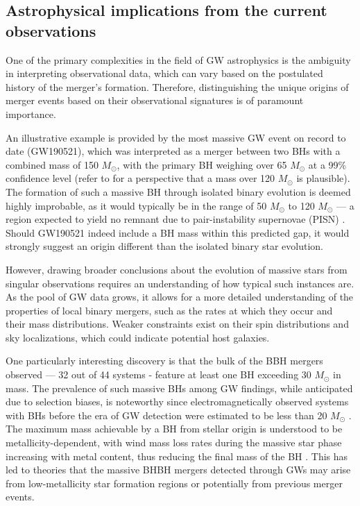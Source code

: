 \subsection{Astrophysical implications from the current observations}
One of the primary complexities in the field of GW astrophysics is the ambiguity in interpreting observational data, which can vary based on the postulated history of the merger's formation. Therefore, distinguishing the unique origins of merger events based on their observational signatures is of paramount importance.

An illustrative example is provided by the most massive GW event on record to date (GW190521), which was interpreted as a merger between two BHs with a combined mass of 150 $M_{\odot}$, with the primary BH weighing over 65 $M_{\odot}$ at a 99\% confidence level (refer to \cite{LIGOScientific:2020aai, Fishbach:2019bbm} for a perspective that a mass over 120 $M_{\odot}$ is plausible). The formation of such a massive BH through isolated binary evolution is deemed highly improbable, as it would typically be in the range of 50 $M_{\odot}$ to 120 $M_{\odot}$ — a region expected to yield no remnant due to pair-instability supernovae (PISN) \cite{Bond:1984sn, Woosley:2016hmi}. Should GW190521 indeed include a BH mass within this predicted gap, it would strongly suggest an origin different than the isolated binary star evolution.

However, drawing broader conclusions about the evolution of massive stars from singular observations requires an understanding of how typical such instances are. As the pool of GW data grows, it allows for a more detailed understanding of the properties of local binary mergers, such as the rates at which they occur and their mass distributions. Weaker constraints exist on their spin distributions and sky localizations, which could indicate potential host galaxies.

One particularly interesting discovery is that the bulk of the BBH mergers observed — 32 out of 44 systems - feature at least one BH exceeding 30 $M_{\odot}$ in mass. The prevalence of such massive BHs among GW findings, while anticipated due to selection biases, is noteworthy since electromagnetically observed systems with BHs before the era of GW detection were estimated to be less than 20 $M_{\odot}$ \cite{Tetarenko:2016uln,Miller-Jones:2021plh}. The maximum mass achievable by a BH from stellar origin is understood to be metallicity-dependent, with wind mass loss rates during the massive star phase increasing with metal content, thus reducing the final mass of the BH \cite{Vink:2001cg,Vink:2005zf}. This has led to theories that the massive BHBH mergers detected through GWs may arise from low-metallicity star formation regions or potentially from previous merger events.


